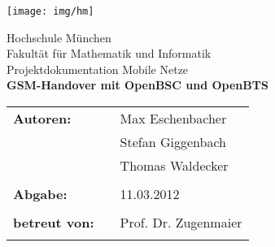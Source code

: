 %
\begin{titlepage}
\begin{flushright}
\texttt{[image: img/hm]}%
\end{flushright}

\vspace*{20mm}
\begin{center}
{\Large Hochschule München}\\
{\large Fakultät für Mathematik und Informatik}\\

\vspace*{15mm}
{\huge Projektdokumentation Mobile Netze}\\

\vspace*{10mm}
{\huge \bfseries{GSM-Handover mit OpenBSC und OpenBTS}} \\
\vspace*{15mm} 
\end{center}

\vspace*{30mm}

\begin{tabular}{lll}
\textbf{\large {Autoren:}} & & \large {Max Eschenbacher}\\
			   & & \large {Stefan Giggenbach}\\
			   & & \large {Thomas Waldecker}\\
& & \\

\textbf{\large {Abgabe:}} & & \large {11.03.2012}\\
& & \\

\textbf{\large {betreut von:}} & & \large {Prof. Dr. Zugenmaier}\\
& & \\
\end{tabular}

\end{titlepage}

\tableofcontents
\leereseite
